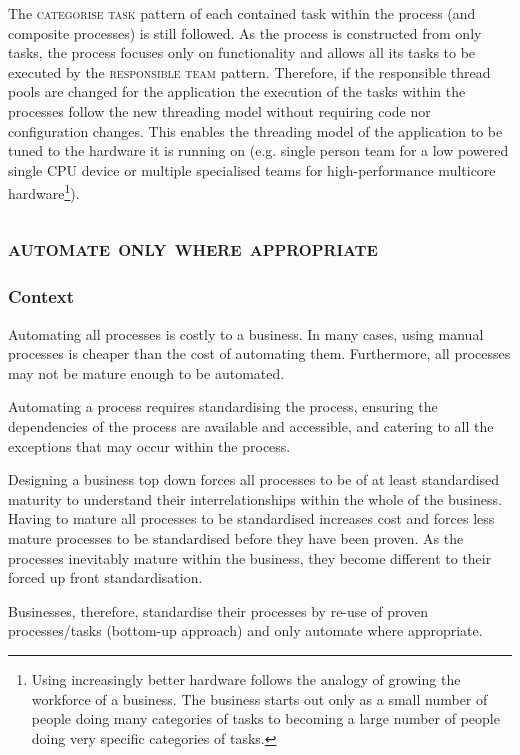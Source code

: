 \documentclass[prodmode]{style/acmlarge}
\begin{document}
The \textsc{categorise task} pattern of each contained task within the process
(and composite processes) is still followed.  As the process is constructed from
only tasks, the process focuses only on functionality and allows all its tasks
to be executed by the \textsc{responsible team} pattern.  Therefore, if the
responsible thread pools are changed for the application the execution of the
tasks within the processes follow the new threading model without requiring code
nor configuration changes.  This enables the threading model of the application
to be tuned to the hardware it is running on (e.g. single person team for a low
powered single CPU device or multiple specialised teams for high-performance
multicore hardware\footnote{Using increasingly better hardware follows the
analogy of growing the workforce of a business.  The business starts out only as
a small number of people doing many categories of tasks to becoming a large
number of people doing very specific categories of tasks.}).



\subsection{\textsc{\textbf{automate only where appropriate}}}

\subsubsection*{Context} Automating all processes is costly to a business.  In
many cases, using manual processes is cheaper than the cost of automating them.
 Furthermore, all processes may not be mature enough to be automated.
 
Automating a process requires standardising the process, ensuring the
dependencies of the process are available and accessible, and catering to all the
exceptions that may occur within the process.

Designing a business top down forces all processes to be of at least
standardised maturity to understand their interrelationships within the whole of
the business.  Having to mature all processes to be standardised increases cost
and forces less mature processes to be standardised before they have been
proven.  As the processes inevitably mature within the business, they become
different to their forced up front standardisation.

Businesses, therefore, standardise their processes by re-use of proven
processes/tasks (bottom-up approach) and only automate where appropriate.
\end{document}
